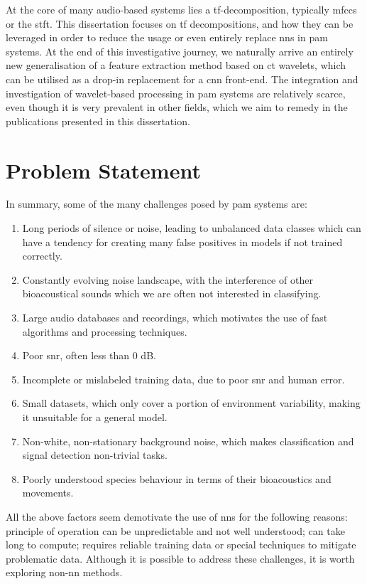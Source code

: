At the core of many audio-based systems lies a \ac{tf}-decomposition, typically \acp{mfcc} or the \ac{stft}. This dissertation focuses on \ac{tf} decompositions, and how they can be leveraged in order to reduce the usage or even entirely replace \acp{nn} in \ac{pam} systems. At the end of this investigative journey, we naturally arrive an entirely new generalisation of a feature extraction method based on \ac{ct} wavelets, which can be utilised as a drop-in replacement for a \ac{cnn} front-end. The integration and investigation of wavelet-based processing in \ac{pam} systems are relatively scarce, even though it is very prevalent in other fields, which we aim to remedy in the publications presented in this dissertation.

\section{Problem Statement}

In summary, some of the many challenges posed by \ac{pam} systems are:
\begin{enumerate}
    \item Long periods of silence or noise, leading to unbalanced data classes which can have a tendency for creating many false positives in models if not trained correctly.
    \item Constantly evolving noise landscape, with the interference of other bioacoustical sounds which we are often not interested in classifying.
    \item Large audio databases and recordings, which motivates the use of fast algorithms and processing techniques.
    \item Poor \ac{snr}, often less than 0 dB.
    \item Incomplete or mislabeled training data, due to poor \ac{snr} and human error.
    \item Small datasets, which only cover a portion of environment variability, making it unsuitable for a general model.
    \item Non-white, non-stationary background noise, which makes classification and signal detection non-trivial tasks.
    \item Poorly understood species behaviour in terms of their bioacoustics and movements.
\end{enumerate}

All the above factors seem demotivate the use of \acp{nn} for the following reasons: principle of operation can be unpredictable and not well understood; can take long to compute; requires reliable training data or special techniques to mitigate problematic data. Although it is possible to address these challenges, it is worth exploring non-\ac{nn} methods. 

